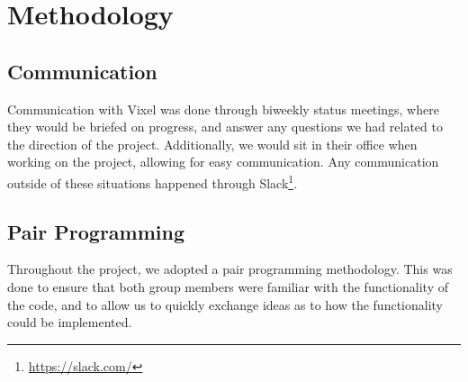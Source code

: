 \section{Methodology}
\subsection{Communication}
Communication with Vixel was done through biweekly status meetings, where they would be briefed on progress, and answer any questions we had related to the direction of the project. Additionally, we would sit in their office when working on the project, allowing for easy communication. Any communication outside of these situations happened through Slack\footnote{\url{https://slack.com/}}.

\subsection{Pair Programming}
Throughout the project, we adopted a pair programming methodology. This was done to ensure that both group members were familiar with the functionality of the code, and to allow us to quickly exchange ideas as to how the functionality could be implemented.
